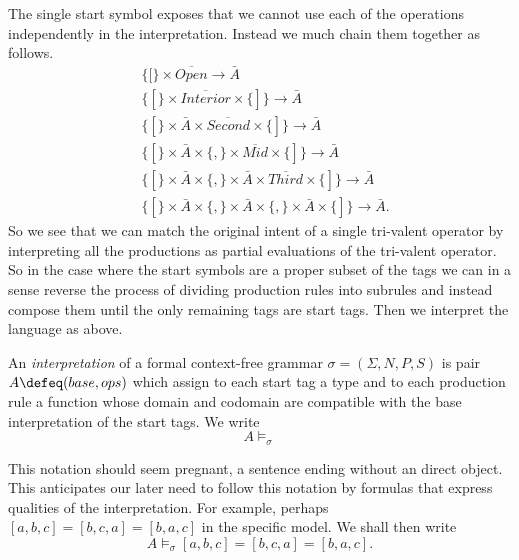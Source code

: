 The single start symbol exposes that we cannot use each of the operations 
independently in the interpretation.  Instead we much chain them together as follows.
\begin{align*}
    & \{[\}\times 
        \overline{Open}
    \to \bar{A}\\
    & \{[\}\times 
        \overline{Interior}
    \times \{]\}\to \bar{A}\\
    & \{[\}\times \bar{A}\times 
        \overline{Second}
    \times \{]\}\to \bar{A}\\
    & \{[\}\times \bar{A}\times  \{,\}
        \times \overline{Mid}
    \times \{]\}\to \bar{A}\\
    & \{[\}\times \bar{A}\times  \{,\}\times \bar{A}\times 
        \overline{Third}
    \times \{]\}\to \bar{A}\\
    & \{[\}\times \bar{A}\times  \{,\}\times \bar{A}\times \{,\}\times \bar{A}
    \times \{]\}\to \bar{A}.
\end{align*}
So we see that we can match the original intent of a single tri-valent operator 
by interpreting all the productions as partial evaluations of the 
tri-valent operator.  So in the case where the start symbols are a proper 
subset of the tags we can in a sense reverse the process of dividing production 
rules into subrules and instead compose them until the only remaining tags 
are start tags.  Then we interpret the language as above.  

\begin{definition}
    An \emph{interpretation} of a formal context-free grammar $\sigma=(\Sigma,N,P,S)$ 
    is pair $A\defeq (base,ops)$ which assign to each start tag a type and 
    to each production rule a function whose domain and codomain are compatible 
    with the base interpretation of the start tags.  We write 
    \[ 
        A\vDash_{\sigma}
    \]
\end{definition}

This notation should seem pregnant, a sentence ending without an direct object.
This anticipates our later need to follow this notation by formulas that express qualities of 
the interpretation.  For example, perhaps $[a,b,c]=[b,c,a]=[b,a,c]$ in the specific 
model.  We shall then write     
\[ 
    A\vDash_{\sigma} [a,b,c]=[b,c,a]=[b,a,c].
\]

